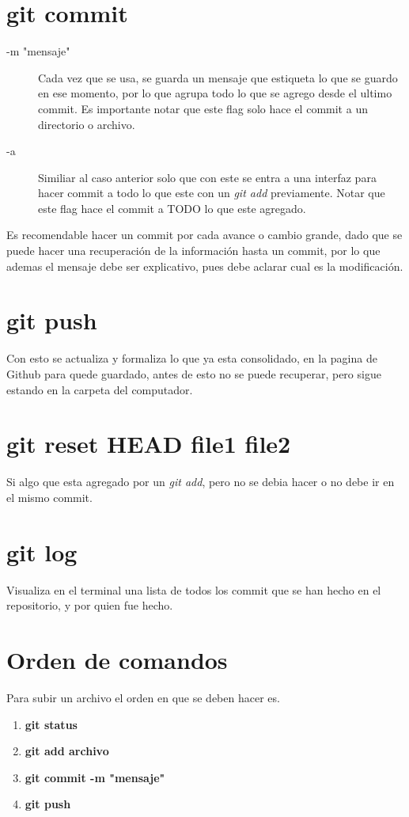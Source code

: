 \documentclass[letter,10pt]{article}
\newcommand{\g}{Github }
\begin{document}
\section{git commit} 
\begin{description}
\item [-m "mensaje"] Cada vez que se usa, se guarda un mensaje que estiqueta lo que se guardo en ese momento, por lo que agrupa todo lo que se agrego desde el ultimo commit. Es importante notar que este flag solo hace el commit a un directorio o archivo.
\item[-a] Similiar al caso anterior solo que con este se entra a una interfaz para hacer commit a todo lo que este con un \textit{git add} previamente. Notar que este flag hace el commit a TODO lo que este agregado.
\end{description}


Es recomendable hacer un commit por cada avance o cambio grande, dado que se puede hacer una recuperación de la información hasta un commit, por lo que ademas el mensaje debe ser explicativo, pues debe aclarar cual es la modificación.

\section{git push}

Con esto se actualiza y formaliza lo que ya esta consolidado, en la pagina de \g para quede guardado, antes de esto no se puede recuperar, pero sigue estando en la carpeta del computador. 

\section{git reset HEAD file1 file2}

Si algo que esta agregado por un \textit{git add}, pero no se debia hacer o no debe ir en el mismo commit.

\section{git log}

Visualiza en el terminal una lista de todos los commit que se han hecho en el repositorio, y por quien fue hecho.

\section{Orden de comandos}
Para subir un archivo el orden en que se deben hacer es. 

\begin{enumerate}
\item \textbf{git status}
\item \textbf{git add archivo}
\item \textbf{git commit -m "mensaje"}
\item \textbf{git push}

\end{enumerate}
 
 
\end{document}
